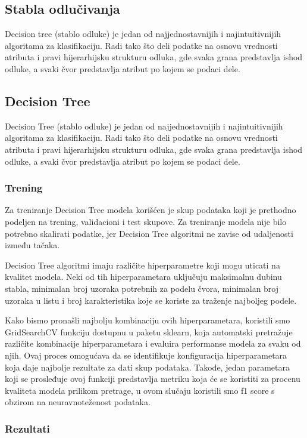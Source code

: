 \documentclass[a4paper,12pt]{article}
\begin{document}
\subsection{Stabla odlučivanja}
Decision tree (stablo odluke) je jedan od najjednostavnijih i najintuitivnijih algoritama za klasifikaciju. Radi tako što deli podatke na osnovu vrednosti atributa i pravi hijerarhijsku strukturu odluka, gde svaka grana predstavlja ishod odluke, a svaki čvor predstavlja atribut po kojem se podaci dele.

\subsection{Decision Tree}
Decision Tree (stablo odluke) je jedan od najjednostavnijih i najintuitivnijih algoritama za klasifikaciju. Radi tako što deli podatke na osnovu vrednosti atributa i pravi hijerarhijsku strukturu odluka, gde svaka grana predstavlja ishod odluke, a svaki čvor predstavlja atribut po kojem se podaci dele.

\subsubsection{Trening}

Za treniranje Decision Tree modela korišćen je skup podataka koji je prethodno podeljen na trening, validacioni i test skupove. Za treniranje modela nije bilo potrebno skalirati podatke, jer Decision Tree algoritmi ne zavise od udaljenosti između tačaka.

Decision Tree algoritmi imaju različite hiperparametre koji mogu uticati na kvalitet modela. Neki od tih hiperparametara uključuju maksimalnu dubinu stabla, minimalan broj uzoraka potrebnih za podelu čvora, minimalan broj uzoraka u listu i broj karakteristika koje se koriste za traženje najboljeg podele.

Kako bismo pronašli najbolju kombinaciju ovih hiperparametara, koristili smo GridSearchCV funkciju dostupnu u paketu sklearn, koja automatski pretražuje različite kombinacije hiperparametara i evaluira performanse modela za svaku od njih. Ovaj proces omogućava da se identifikuje konfiguracija hiperparametara koja daje najbolje rezultate za dati skup podataka. Takođe, jedan parametara koji se prosleđuje ovoj funkciji predstavlja metriku koja će se koristiti za procenu kvaliteta modela prilikom pretrage, u ovom slučaju koristili smo f1 score s obzirom na neuravnoteženost podataka.


\subsubsection{Rezultati}
\end{document}

